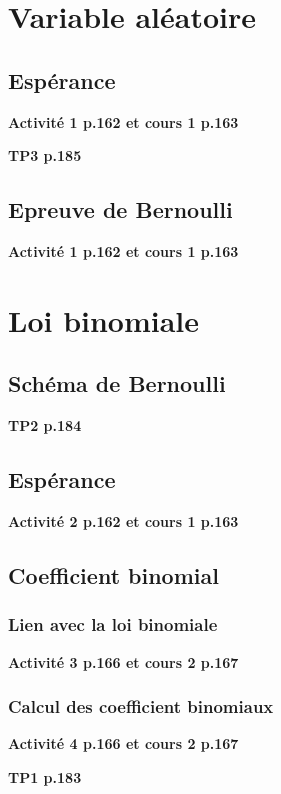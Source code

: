 \documentclass[10pt,a4paper,openany,twoside, eleve]{book}
\begin{document}
\entetegal
\makeatletter
{} %
\makeatother

\setcounter{sectionexo}{1}


\section{Variable aléatoire}
\subsection{Espérance}
\textbf{Activité 1 p.162 et cours 1 p.163}

\textbf{TP3 p.185}

\subsection{Epreuve de Bernoulli}
\textbf{Activité 1 p.162 et cours 1 p.163}


\section{Loi binomiale}
\subsection{Schéma de Bernoulli}
\textbf{TP2 p.184}

\subsection{Espérance}
\textbf{Activité 2 p.162 et cours 1 p.163}

\subsection{Coefficient binomial}
\subsubsection*{Lien avec la loi binomiale}
\textbf{Activité 3 p.166 et cours 2 p.167}

\subsubsection*{Calcul des coefficient binomiaux}
\textbf{Activité 4 p.166 et cours 2 p.167}

\textbf{TP1 p.183}
\end{document}
